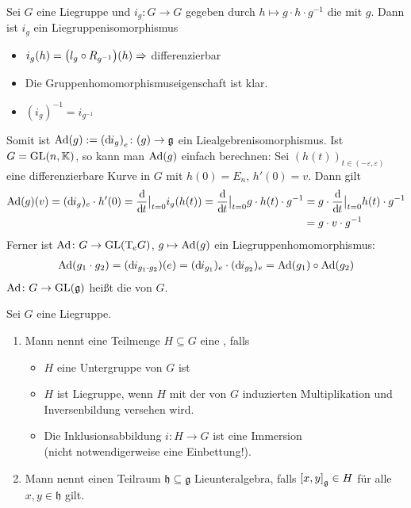 Sei $G$ eine Liegruppe und $i_g \colon G \to G$ gegeben durch $h \mapsto g \cdot h \cdot g^{-1}$ die  mit $g$.
Dann ist $i_g$ ein Liegruppenisomorphismus
\begin{itemize}
	\item $i_g(h) = \enbrace*{l_g \circ R_{g^{-1}}}(h) \Rightarrow$ differenzierbar
	\item Die Gruppenhomomorphismuseigenschaft ist klar. 
	\item $(i_g)^{-1}= i_{g^{-1}}$
\end{itemize}
Somit ist $\Ad(g) := \enbrace*{\mathd i_g}_e \colon \mathfrak(g) \to \mathfrak{g}$ ein Liealgebrenisomorphismus.
Ist $G = \GL(n,\mathbb{K})$, so kann man $\Ad(g)$ einfach berechnen:
Sei $(h(t))_{t \in (-\varepsilon,\varepsilon)}$ eine differenzierbare Kurve in $G$ mit $h(0)= E_n$, $h'(0)=v$.
Dann gilt
\begin{align}
	\Ad(g)(v)= (\mathd i_g)_e \cdot h'(0) = \diffd{}{t}\big|_{t=0} i_g (h(t)) = \diffd{}{t}\big|_{t=0} g \cdot h(t) \cdot g^{-1}
	&= g \cdot \diffd{}{t}\big|_{t=0} h(t) \cdot g^{-1}\\
	&= g \cdot v \cdot g^{-1}
\end{align}
Ferner ist $\Ad \colon G \to \GL\enbrace*{\Tmap_e G}$, $g \mapsto \Ad(g)$ ein Liegruppenhomomorphismus:
\begin{align}
	\Ad(g_1 \cdot g_2) = (\mathd i_{g_1 \cdot g_2})(e) = (\mathd i_{g_1})_e \cdot (\mathd i_{g_2})_e = \Ad(g_1) \circ \Ad(g_2)
\end{align}
$\Ad \colon G \to \GL(\mathfrak{g})$ heißt die  von $G$.

\begin{definition}
	Sei $G$ eine Liegruppe.
	\begin{enumerate}[1)]
		\item Mann nennt eine Teilmenge $H \subseteq G$ eine , falls 
		\begin{itemize}
			\item $H$ eine Untergruppe von $G$ ist
			\item $H$ ist Liegruppe, wenn $H$ mit der von $G$ induzierten Multiplikation und Inversenbildung versehen wird.
			\item Die Inklusionsabbildung $i \colon H \to G$ ist eine Immersion\\ 
			(nicht notwendigerweise eine Einbettung!).
		\end{itemize}
		\item Mann nennt einen Teilraum $\mathfrak{h} \subseteq \mathfrak{g}$ Lieunteralgebra, falls $\benbrace*{x,y}_\mathfrak{g} \in H$ für alle $x,y \in \mathfrak{h}$ gilt.
	\end{enumerate}
\end{definition}
 
